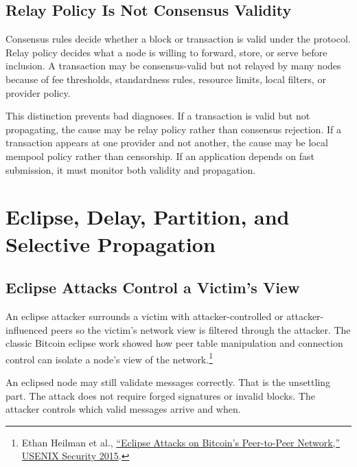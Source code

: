 \subsection{Relay Policy Is Not Consensus Validity}

Consensus rules decide whether a block or transaction is valid under the protocol. Relay policy decides what a node is willing to forward, store, or serve before inclusion. A transaction may be consensus-valid but not relayed by many nodes because of fee thresholds, standardness rules, resource limits, local filters, or provider policy.

This distinction prevents bad diagnoses. If a transaction is valid but not propagating, the cause may be relay policy rather than consensus rejection. If a transaction appears at one provider and not another, the cause may be local mempool policy rather than censorship. If an application depends on fast submission, it must monitor both validity and propagation.

\section{Eclipse, Delay, Partition, and Selective Propagation}

\subsection{Eclipse Attacks Control a Victim's View}

An eclipse attacker surrounds a victim with attacker-controlled or attacker-influenced peers so the victim's network view is filtered through the attacker. The classic Bitcoin eclipse work showed how peer table manipulation and connection control can isolate a node's view of the network.\footnote{Ethan Heilman et al., \href{https://www.usenix.org/conference/usenixsecurity15/technical-sessions/presentation/heilman}{``Eclipse Attacks on Bitcoin's Peer-to-Peer Network,'' USENIX Security 2015}.}

An eclipsed node may still validate messages correctly. That is the unsettling part. The attack does not require forged signatures or invalid blocks. The attacker controls which valid messages arrive and when.

